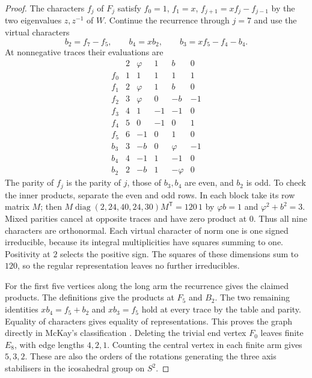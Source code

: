 \documentclass[aps,pra,onecolumn,superscriptaddress,nofootinbib,10pt]{revtex4-2}
\theoremstyle{definition}
\theoremstyle{remark}
\begin{document}
\begin{proof}
The characters $f_j$ of $F_j$ satisfy $f_0=1$, $f_1=x$,
$f_{j+1}=xf_j-f_{j-1}$ by the two eigenvalues $z,z^{-1}$ of $W$.
Continue the recurrence through $j=7$ and use the virtual characters
\[
 b_2=f_7-f_5,\qquad b_4=xb_2,\qquad b_3=x f_5-f_4-b_4.
\]
At nonnegative traces their evaluations are
\[
\begin{array}{c|rrrrr}
 &2&\varphi&1&b&0\\\hline
 f_0&1&1&1&1&1\\
 f_1&2&\varphi&1&b&0\\
 f_2&3&\varphi&0&-b&-1\\
 f_3&4&1&-1&-1&0\\
 f_4&5&0&-1&0&1\\
 f_5&6&-1&0&1&0\\
 b_3&3&-b&0&\varphi&-1\\
 b_4&4&-1&1&-1&0\\
 b_2&2&-b&1&-\varphi&0
\end{array}
\]
The parity of $f_j$ is the parity of $j$, those of $b_3,b_4$ are
even, and $b_2$ is odd. To check the inner products, separate the
even and odd rows. In each block take its row matrix $M$; then
$M\operatorname{diag}(2,24,40,24,30)M^{\mathsf T}=120\,1$ by
$\varphi b=1$ and $\varphi^2+b^2=3$. Mixed parities cancel at
opposite traces and have zero product at $0$. Thus all nine
characters are orthonormal. Each virtual character of norm one is
one signed irreducible, because its integral multiplicities have
squares summing to one. Positivity at $2$ selects the positive sign.
The squares of these dimensions sum to $120$, so the regular
representation leaves no further irreducibles.

For the first five vertices along the long arm the recurrence gives
the claimed products. The definitions give the products at $F_5$
and $B_2$. The two remaining identities $xb_4=f_5+b_2$ and $xb_3=f_5$
hold at every trace by the table and parity. Equality of characters gives equality of
representations. This proves the graph directly in McKay's
classification \cite{gn:mckaysource}. Deleting the trivial end
vertex $F_0$ leaves finite $E_8$, with edge lengths $4,2,1$.
Counting the central vertex in each finite arm gives $5,3,2$.
These are also the orders of the rotations generating the three
axis stabilisers in the icosahedral group on $S^2$.
\end{proof}
\end{document}
